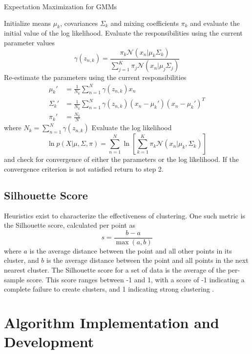 \documentclass[11pt]{amsart}
\begin{document}
\begin{algorithm}
    \caption{Expectation Maximization for GMMs}\label{alg:gmm}
    \begin{algorithmic}[1]
        \State Initialize means \(\mu_k\), covariances \(\Sigma_k\) and mixing coefficients \(\pi_k\) and evaluate the initial value of the log likelihood.
        \State Evaluate the responsibilities using the current parameter values
        \[ \gamma(z_{n,k}) = \frac{\pi_k \mathcal{N}(x_n | \mu_k \Sigma_k)}{\sum_{j=1}^K \pi_j \mathcal{N}(x_n | \mu_j \Sigma_j)}\]
        \State Re-estimate the parameters using the current responsibilities
        \begin{align*}
            \mu_k' &= \frac{1}{N_k} \sum_{n=1}^N \gamma(z_{n, k})x_n \\
            \Sigma_k' &= \frac{1}{N_k} \sum_{n=1}^{N} \gamma(z_{n, k})(x_n - \mu_k')(x_n - \mu_k')^T \\
            \pi_k' &= \frac{N_k}{N}
        \end{align*}
        where \(N_k = \sum_{n=1}^N \gamma(z_{n, k})\)
        \State Evaluate the log likelihood
        \[ \ln p(X | \mu, \Sigma, \pi) = \sum_{n=1}^N \ln \left[\sum_{k=1}^K \pi_k \mathcal{N}(x_n | \mu_k, \Sigma_k)\right] \]
        and check for convergence of either the parameters or the log likelihood. If the convergence criterion is not satisfied return to step 2. 
    \end{algorithmic}
\end{algorithm}

\subsection*{Silhouette Score}\label{sec:silhouette-score}

Heuristics exist to characterize the
effectiveness of clustering. One such metric is the Silhouette score, calculated
per point as
\[ s = \frac{b - a}{\max(a, b)} \] where \(a\) is the average distance between
the point and all other points in its cluster, and \(b\) is the average distance
between the point and all points in the next nearest cluster. The Silhouette
score for a set of data is the average of the per-sample score. This score
ranges between -1 and 1, with a score of -1 indicating a complete failure to
create clusters, and 1 indicating strong clustering \cite{sklearn-clustering}. 

\section{Algorithm Implementation and Development}\label{sec:algorithms}
\end{document}
